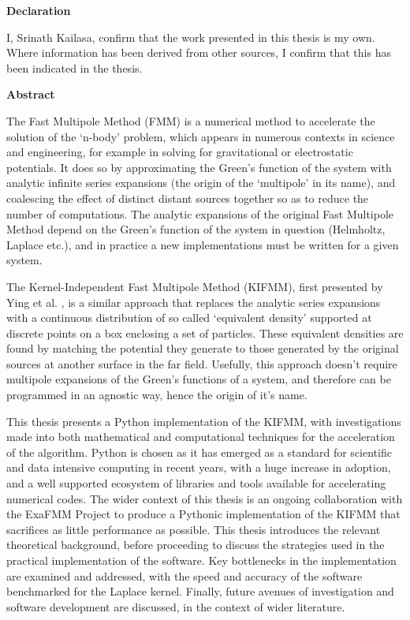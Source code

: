 \thispagestyle{plain}

\begin{center}
    \textbf{Declaration}
\end{center}
I, Srinath Kailasa, confirm that the work presented in this thesis is my own. Where information has been derived from other
sources, I confirm that this has been indicated in the thesis.

\begin{center}
    \textbf{Abstract}
\end{center}

The Fast Multipole Method (\gls{FMM}) is a numerical method to accelerate the solution
of the `n-body' problem, which appears in numerous contexts in science and engineering,
for example in solving for gravitational or electrostatic potentials. It does so by approximating
the Green's function of the
system with analytic infinite series expansions (the origin of the `multipole' in its name),
 and coalescing the effect of distinct distant sources together so as to
reduce the number of computations. The analytic expansions of the
original Fast Multipole Method depend on the Green's function of the system in
question (Helmholtz, Laplace etc.), and in practice a new implementations
must be written for a given system.

The Kernel-Independent Fast Multipole Method (\gls{KIFMM}),
first presented by Ying et al. \cite{Ying:2004:JCP}, is a similar approach that replaces
the analytic series expansions with a continuous distribution of so called
`equivalent density' supported at discrete points on a box enclosing a set of
particles. These equivalent densities are found by matching the potential they
generate to those generated by the original sources at another surface in the
far field. Usefully, this approach doesn't require multipole expansions of the
Green's functions of a system, and therefore can be programmed in an agnostic way,
hence the origin of it's name.

This thesis presents a Python implementation of
the KIFMM, with investigations made into both mathematical and computational
techniques for the acceleration of the algorithm. Python is chosen as it has emerged as a standard
for scientific and data intensive computing in recent years, with a huge increase
in adoption, and a well supported ecosystem of libraries and tools available for
accelerating numerical codes. The wider context of this thesis
is an ongoing collaboration with the ExaFMM Project \cite{exafmm} to produce a Pythonic
implementation of the KIFMM that sacrifices as little performance as possible.
This thesis introduces the relevant theoretical background, before
proceeding to discuss the strategies used in the practical implementation of the
software. Key bottlenecks in the implementation are examined and addressed, with the speed
and accuracy of the software benchmarked for the Laplace kernel. Finally, future
avenues of investigation and software development are discussed, in the context
of wider literature.
